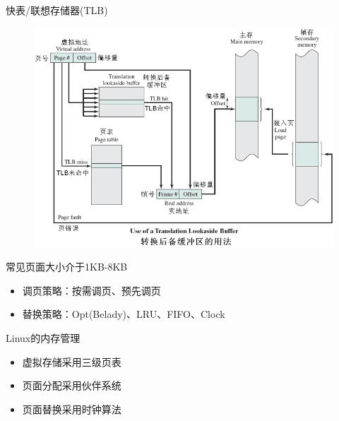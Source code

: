 快表/联想存储器(TLB)
\begin{figure}[H]
    \centering
    \includegraphics[width=0.8\linewidth]{fig/TLB.png}
\end{figure}

常见页面大小介于1KB-8KB

\begin{itemize}
    \item 调页策略：按需调页、预先调页
    \item 替换策略：Opt(Belady)、LRU、FIFO、Clock
\end{itemize}

Linux的内存管理
\begin{itemize}
    \item 虚拟存储采用三级页表
    \item 页面分配采用伙伴系统
    \item 页面替换采用时钟算法
\end{itemize}